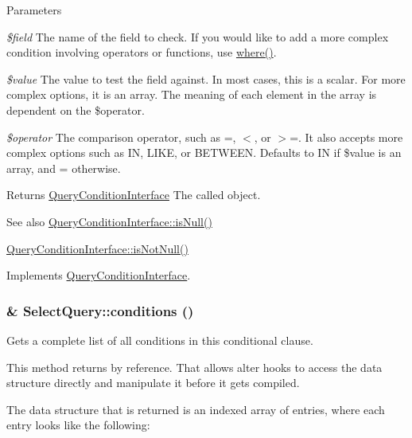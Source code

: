 \begin{DoxyParams}{Parameters}
\item[{\em \$field}]The name of the field to check. If you would like to add a more complex condition involving operators or functions, use \hyperlink{classSelectQuery_a9cd4e4c627c922318203fb1193784d18}{where()}. \item[{\em \$value}]The value to test the field against. In most cases, this is a scalar. For more complex options, it is an array. The meaning of each element in the array is dependent on the \$operator. \item[{\em \$operator}]The comparison operator, such as =, $<$, or $>$=. It also accepts more complex options such as IN, LIKE, or BETWEEN. Defaults to IN if \$value is an array, and = otherwise.\end{DoxyParams}
\begin{DoxyReturn}{Returns}
\hyperlink{interfaceQueryConditionInterface}{QueryConditionInterface} The called object.
\end{DoxyReturn}
\begin{DoxySeeAlso}{See also}
\hyperlink{interfaceQueryConditionInterface_a2978b536a3fe62b21e940366c9cb5923}{QueryConditionInterface::isNull()} 

\hyperlink{interfaceQueryConditionInterface_a8bbb6acc9c72911b165cf6eb1dc31453}{QueryConditionInterface::isNotNull()} 
\end{DoxySeeAlso}


Implements \hyperlink{interfaceQueryConditionInterface_aa6d9d96fa17441b5222d1ffddd4c1799}{QueryConditionInterface}.\hypertarget{classSelectQuery_a5cdf8e2be2dfd407bdc34bfaa2c216ad}{
\subsubsection[{conditions}]{\setlength{\rightskip}{0pt plus 5cm}\& SelectQuery::conditions ()}}
\label{classSelectQuery_a5cdf8e2be2dfd407bdc34bfaa2c216ad}
Gets a complete list of all conditions in this conditional clause.

This method returns by reference. That allows alter hooks to access the data structure directly and manipulate it before it gets compiled.

The data structure that is returned is an indexed array of entries, where each entry looks like the following: 



